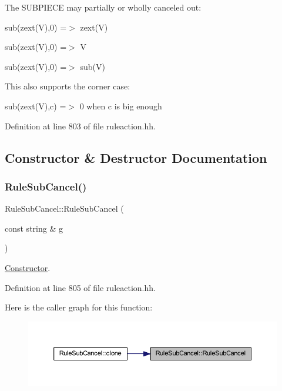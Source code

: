 The S\+U\+B\+P\+I\+E\+CE may partially or wholly canceled out\+:
\begin{DoxyItemize}
\item {\ttfamily sub(zext(\+V),0) =$>$ zext(\+V)}
\item {\ttfamily sub(zext(\+V),0) =$>$ V}
\item {\ttfamily sub(zext(\+V),0) =$>$ sub(\+V)}
\end{DoxyItemize}

This also supports the corner case\+:
\begin{DoxyItemize}
\item {\ttfamily sub(zext(\+V),c) =$>$ 0 when c is big enough} 
\end{DoxyItemize}

Definition at line 803 of file ruleaction.\+hh.



\subsection{Constructor \& Destructor Documentation}
\mbox{\label{class_rule_sub_cancel_a73d926dd90c09be7af20966a24c96207}} 
\subsubsection{\texorpdfstring{RuleSubCancel()}{RuleSubCancel()}}
{\footnotesize\ttfamily Rule\+Sub\+Cancel\+::\+Rule\+Sub\+Cancel (\begin{DoxyParamCaption}\item[{const string \&}]{g }\end{DoxyParamCaption})\hspace{0.3cm}{\ttfamily [inline]}}



\mbox{\hyperlink{class_constructor}{Constructor}}. 



Definition at line 805 of file ruleaction.\+hh.

Here is the caller graph for this function\+:
\nopagebreak
\begin{figure}[H]
\begin{center}
\leavevmode
\includegraphics[width=350pt]{class_rule_sub_cancel_a73d926dd90c09be7af20966a24c96207_icgraph}
\end{center}
\end{figure}


